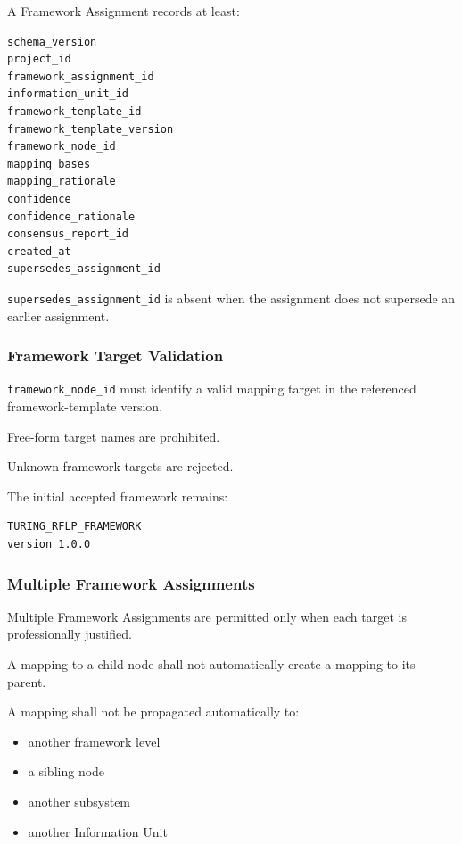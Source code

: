 A Framework Assignment records at least:

\begin{verbatim}
schema_version
project_id
framework_assignment_id
information_unit_id
framework_template_id
framework_template_version
framework_node_id
mapping_bases
mapping_rationale
confidence
confidence_rationale
consensus_report_id
created_at
supersedes_assignment_id
\end{verbatim}

\texttt{supersedes\_assignment\_id} is absent when the assignment does not supersede an earlier assignment.

\hypertarget{framework-target-validation}{%
\subsubsection{Framework Target Validation}\label{framework-target-validation}}

\texttt{framework\_node\_id} must identify a valid mapping target in the referenced framework-template version.

Free-form target names are prohibited.

Unknown framework targets are rejected.

The initial accepted framework remains:

\begin{verbatim}
TURING_RFLP_FRAMEWORK
version 1.0.0
\end{verbatim}

\hypertarget{multiple-framework-assignments}{%
\subsubsection{Multiple Framework Assignments}\label{multiple-framework-assignments}}

Multiple Framework Assignments are permitted only when each target is professionally justified.

A mapping to a child node shall not automatically create a mapping to its parent.

A mapping shall not be propagated automatically to:

\begin{itemize}
\tightlist
\item
  another framework level
\item
  a sibling node
\item
  another subsystem
\item
  another Information Unit
\end{itemize}

